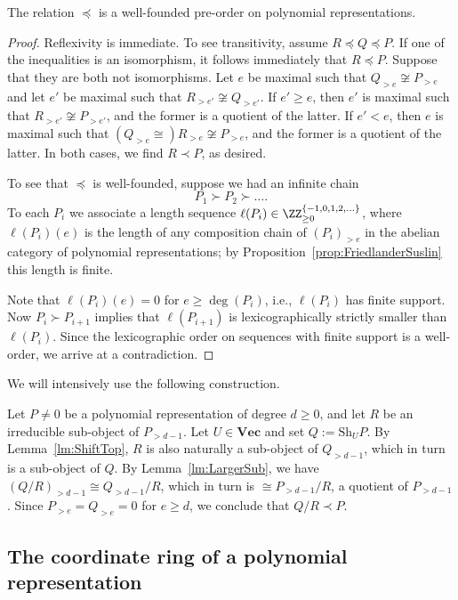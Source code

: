 \documentclass{amsart}
\renewcommand{\Vec}{\mathbf{Vec}}
\newcommand{\Sh}{\mathrm{Sh}}
\begin{document}
\begin{lm}
The relation $\preceq$ is a well-founded pre-order on polynomial
representations.
\end{lm}

\begin{proof}
Reflexivity is immediate.  To see transitivity, assume $R \preceq Q
\preceq P$. If one of the inequalities is an isomorphism, it follows
immediately that $R \preceq P$. Suppose that they are both not
isomorphisms. Let $e$ be maximal such that $Q_{>e} \not \cong P_{>e}$
and let $e'$ be maximal such that $R_{>e'} \not \cong Q_{>e'}$. If $e'
\geq e$, then $e'$ is maximal such that $R_{>e'} \not \cong P_{>e'}$, and
the former is a quotient of the latter. If  $e' < e$, then $e$ is maximal
such that $(Q_{>e} \cong )R_{>e} \not \cong P_{>e}$, and the former is
a quotient of the latter. In both cases, we find $R \prec P$, as desired.

To see that $\preceq$ is well-founded, suppose we had an infinite chain 
\[ P_1 \succ P_2 \succ \ldots. \] 
To each $P_i$ we associate a length sequence $\ell(P_i) \in \ZZ_{\geq
0}^{\{-1,0,1,2,\ldots\}}$, where $\ell(P_i)(e)$ is the length of any
composition chain of $(P_i)_{>e}$ in the abelian category of polynomial
representations; by Proposition~\ref{prop:FriedlanderSuslin} this length is finite.

Note that $\ell(P_i)(e)=0$ for $e \geq \deg(P_i)$, i.e., $\ell(P_i)$
has finite support. Now $P_i \succ P_{i+1}$ implies that 
$\ell(P_{i+1})$ is lexicographically strictly smaller
than $\ell(P_i)$. Since the lexicographic order on sequences with
finite support is a well-order, we arrive at a contradiction.
\end{proof}

We will intensively use the following construction.  

\begin{ex}
Let $P \neq 0$ be a polynomial representation of degree $d \geq 0$, and let
$R$ be an irreducible sub-object of $P_{>d-1}$. Let $U \in \Vec$ and
set $Q:=\Sh_U P$. By Lemma~\ref{lm:ShiftTop}, $R$ is also naturally
a sub-object of $Q_{>d-1}$, which in turn is a sub-object of $Q$. By
Lemma~\ref{lm:LargerSub}, we have $(Q/R)_{>d-1} \cong Q_{>d-1}/R$,
which in turn is $\cong P_{>d-1}/R$, a quotient of $P_{>d-1}$. Since
$P_{>e}=Q_{>e}=0$ for $e \geq d$, we conclude that $Q/R \prec P$.
\end{ex}

\subsection{The coordinate ring of a polynomial
representation}
\end{document}

